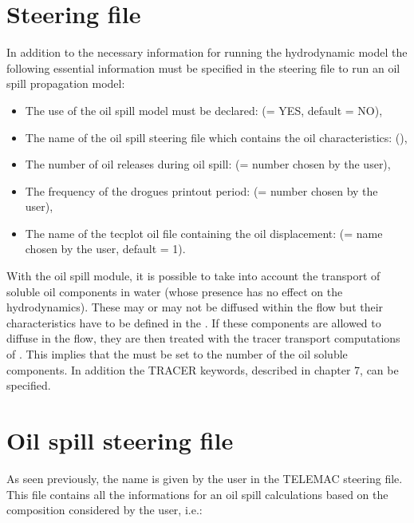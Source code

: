 \section{Steering file}

In addition to the necessary information for running the 
hydrodynamic model the following essential information must be specified in the
 steering file to run an oil spill propagation model:

\begin{itemize}
\item The use of the oil spill model must be declared: 
(= YES, default = NO),

\item The name of the oil spill steering file which contains the oil
characteristics: (),

\item The number of oil releases during oil spill: (= number chosen by the user),

\item The frequency of the drogues printout period: (= number chosen by the user),

\item The name of the tecplot oil file containing the oil displacement:
(= name chosen by the user, default = 1).
\end{itemize}

With the oil spill module, it is possible to take into account the transport of
soluble oil components in water (whose presence has no effect on the
hydrodynamics). These may or may not be diffused within the flow but their
characteristics have to be defined in the . If
these components are allowed to diffuse in the flow, they are then treated with
the tracer transport computations of . This implies that the
 must be set to the number of the oil soluble
components. In addition the TRACER keywords, described in chapter 7, can be
specified.


\section{Oil spill steering file}

As seen previously, the  name is given by the
user in the TELEMAC steering file. This file contains all the informations for
an oil spill calculations based on the composition considered by the user,
i.e.:

